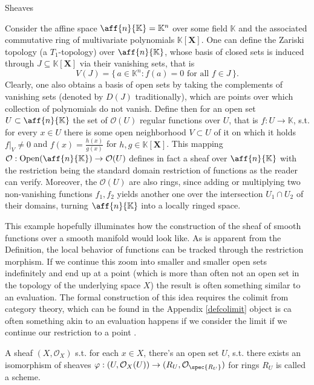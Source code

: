 \begin{section}{Sheaves}
\begin{example}
    Consider the affine space \(\aff{n}{\mathbb{K}} = \mathbb{K}^n\) over some field \( \mathbb{K} \) 
    and the associated commutative ring of multivariate polynomials \( \mathbb{K}[\mathbf{X}] \).
    One can define the Zariski topology (a \( T_1 \)-topology) over \( \aff{n}{\mathbb{K}} \), whose basis of closed sets is induced through 
    \( J \subseteq \mathbb{K}[\mathbf{X}] \) via their vanishing sets, that is 
    \[ V(J) = \{\, a \in \mathbb{K}^n : f(a) = 0 \text{ for all } f \in J \,\}. \]
    Clearly, one also obtains a basis of open sets by taking the complements of vanishing sets (denoted by \( D(J) \)
    traditionally), which are points over which collection of polynomials do not vanish.
    Define then for an open set \( U \subset \aff{n}{\mathbb{K}} \) the set of \( \mathcal{O}(U) \) regular functions over \( U \), that is 
    \( f : U \to \mathbb{K} \), s.t. for every \( x \in U \) there is some open neighborhood \( V \subset U \) of it on which it holds
    \( f|_{V} \neq 0 \) and \( f(x) = \frac{h(x)}{g(x)} \) for \( h, g \in \mathbb{K}[\mathbf{X}] \).
    This mapping \( \mathcal{O} : \text{Open}(\aff{n}{\mathbb{K}}) \to \mathcal{O}(U) \) defines in fact a sheaf over \( \aff{n}{\mathbb{K}} \)
    with the restriction being the standard domain restriction of functions as the reader can verify. Moreover, the 
    \( \mathcal{O}(U) \) are also rings, since adding or multiplying two non-vanishing functions \( f_1, f_2 \) yields another one 
    over the intersection \( U_1 \cap U_2 \) of their domains, turning \( \aff{n}{\mathbb{K}} \) into a locally ringed space.
\end{example}

This example hopefully illuminates how the construction of the sheaf of smooth functions over a smooth manifold would look like.
As is apparent from the Definition, the local behavior of functions can be tracked through the restriction morphism. If we continue this 
zoom into smaller and smaller open sets indefinitely and end up at a point (which is more than often not an open set in the topology of the underlying space \( X \)) the result is often something similar to an evaluation. The formal construction of this idea requires the colimit 
from category theory, which can be found in the Appendix \ref{defcolimit}
object is ca
often something
akin to an evaluation happens if we consider the limit if we continue our restriction to a point .


\begin{definition} \label{defscheme}
    A sheaf \( (X, \mathcal{O}_X) \) s.t. for each \( x \in X \), there's an open set \( U \),
    s.t. there exists an isomorphism of sheaves \( \varphi : (U, \mathcal{O}_X(U)) \to (R_U, \mathcal{O}_{\spec{R_U}}) \)
    for rings \( R_U \) is called a scheme.
\end{definition}


\end{section}
